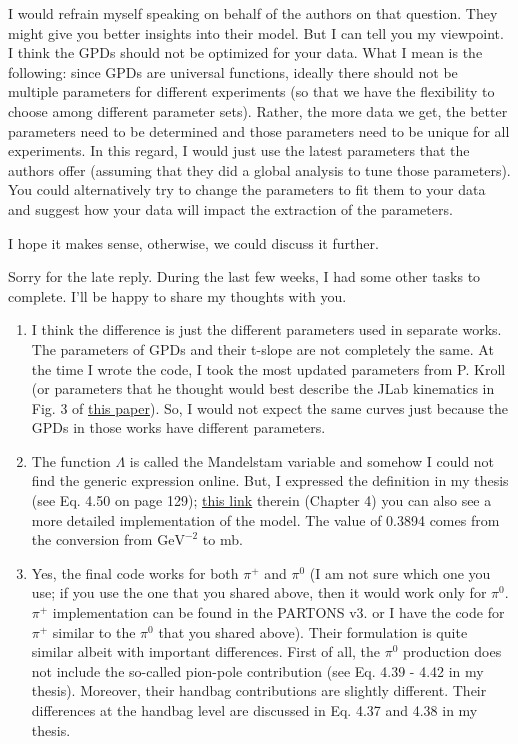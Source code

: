 I would refrain myself speaking on behalf of the authors on that question. They might give you better insights into their model. But I can tell you my viewpoint. I think the GPDs should not be optimized for your data. What I mean is the following: since GPDs are universal functions, ideally there should not be multiple parameters for different experiments (so that we have the flexibility to choose among different parameter sets). Rather, the more data we get, the better parameters need to be determined and those parameters need to be unique for all experiments. In this regard, I would just use the latest parameters that the authors offer (assuming that they did a global analysis to tune those parameters). You could alternatively try to change the parameters to fit them to your data and suggest how your data will impact the extraction of the parameters.

I hope it makes sense, otherwise, we could discuss it further.

Sorry for the late reply. During the last few weeks, I had some other tasks to complete. I'll be happy to share my thoughts with you.

\begin{enumerate}
    \item I think the difference is just the different parameters used in separate works. The parameters of GPDs and their t-slope are not completely the same. At the time I wrote the code, I took the most updated parameters from P. Kroll (or parameters that he thought would best describe the JLab kinematics in Fig. 3 of \href{https://arxiv.org/pdf/2007.15677.pdf}{this paper}). So, I would not expect the same curves just because the GPDs in those works have different parameters.

    \item The function $\Lambda$ is called the Mandelstam variable and somehow I could not find the generic expression online. But, I expressed the definition in my thesis (see Eq. 4.50 on page 129); \href{https://www.osti.gov/biblio/1881460}{this link} therein (Chapter 4) you can also see a more detailed implementation of the model. The value of 0.3894 comes from the conversion from $\text{GeV}^{-2}$ to mb.

    \item Yes, the final code works for both $\pi^+$ and $\pi^0$ (I am not sure which one you use; if you use the one that you shared above, then it would work only for $\pi^0$. $\pi^+$ implementation can be found in the PARTONS v3. or I have the code for $\pi^+$ similar to the $\pi^0$ that you shared above). Their formulation is quite similar albeit with important differences. First of all, the $\pi^0$ production does not include the so-called pion-pole contribution (see Eq. 4.39 - 4.42 in my thesis). Moreover, their handbag contributions are slightly different. Their differences at the handbag level are discussed in Eq. 4.37 and 4.38 in my thesis.
\end{enumerate}

